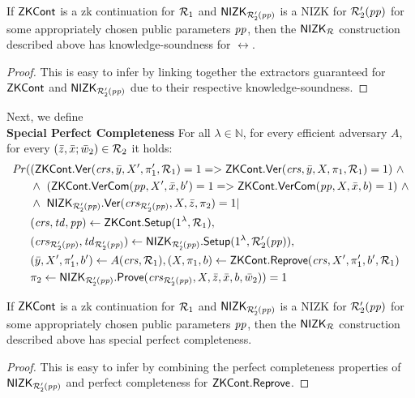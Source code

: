\begin{lemma} 
\label{le:KS_for_nizkR}
If ${\mathsf{ZKCont}}$ is a zk continuation for $\mathcal{R}_1$ and ${\mathsf{NIZK_{\mathcal{R}'_2(\mathit{pp})}}}$ is a NIZK for $\mathcal{R}_2'(\mathit{pp})$ for some appropriately chosen public parameters $\mathit{pp}$, 
then the ${\mathsf{NIZK_{\mathcal{R}}}}$ construction described above has knowledge-soundness for $\rel$. 
\end{lemma} 
\begin{proof}This is easy to infer by linking together the extractors guaranteed for ${\mathsf{ZKCont}}$ and ${\mathsf{NIZK_{\mathcal{R}'_2(\mathit{pp})}}}$ due to their respective 
knowledge-soundness.
\end{proof}
 
\noindent Next, we define \\ 
\noindent \textbf{Special Perfect Completeness} For all $\lambda \in \mathbb{N}$, for every efficient adversary $A$, for every 
 $(\bar{z}, \bar{x}; \bar{w}_2) \in \mathcal{R}_2$ it holds: 
\begin{align*}
\mathit{Pr} (& (\ZKCont.\Verify(\crs, \bar{y}, X', \pi'_1, \relone) = 1  = >  \ZKCont.\Verify(\crs, \bar{y}, X, \pi_1, \relone) = 1)  \ \wedge \  \\
                   & \wedge \ (\ZKCont.\VerifyCom (\pp, X', \barx, b') = 1 => \ZKCont.\VerifyCom (\pp, X, \barx, b) = 1) \ \wedge \\
                   & \wedge \ \nizktwo.\Verify(\crstwo, X, \barz, \pi_2) =1 | \\
                   & (\crs, \tw, \pp) \leftarrow \ZKCont.\Setup (1^{\lambda}, \relone),  \\ 
                   & (\crstwo, \twtwo) \leftarrow \nizktwo.\Setup(1^{\lambda}, \reltwo'(\pp)),  \\
                   & (\bary, X', \pi'_1, b') \leftarrow A(\crs,\relone), (X, \pi_1, b) \leftarrow \ZKCont.\Reprove(\crs, X', \pi'_1, b', \relone) \\
                   &\pi_2 \leftarrow \nizktwo.\Prove(\crstwo, X, \barz, \barx, b, \baromega_2)) = 1
\end{align*}

\begin{lemma} 
\label{le:specialCompl_for_nizkR}
If ${\mathsf{ZKCont}}$ is a zk continuation for $\mathcal{R}_1$ and ${\mathsf{NIZK_{\mathcal{R}'_2(\mathit{pp})}}}$ is a NIZK for $\mathcal{R}_2'(\mathit{pp})$ for some appropriately chosen public parameters $\mathit{pp}$, 
then the ${\mathsf{NIZK_{\mathcal{R}}}}$ construction described above has special perfect completeness.
\end{lemma} 
\begin{proof} This is easy to infer by combining the perfect completeness properties of ${\mathsf{NIZK_{\mathcal{R}'_2(\mathit{pp})}}}$ and perfect completeness 
for ${\mathsf{ZKCont}}.{\mathsf{Reprove}}$.
\end{proof}

